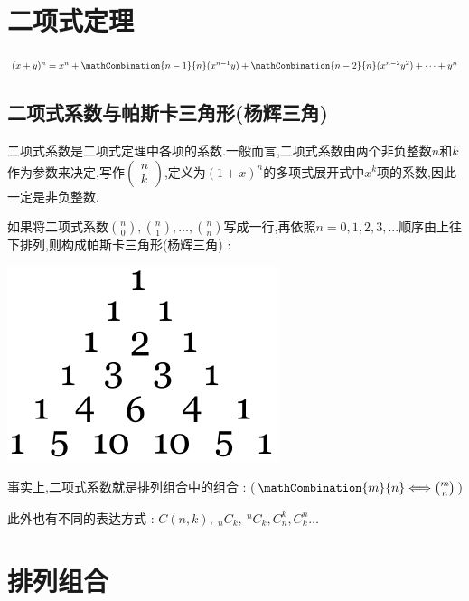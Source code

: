 {\section{二项式定理}{
  $(x + y)^n = x^n + \mathCombination{n - 1}{n}(x^{n-1} y) + \mathCombination{n - 2}{n}(x^{n-2} y^2) + \dots + y^n$

  \subsection{二项式系数与帕斯卡三角形(杨辉三角)}{

      二项式系数是二项式定理中各项的系数.一般而言,二项式系数由两个非负整数$n$和$k$作为参数来决定,写作$\begin{pmatrix}
              n \\
              k
          \end{pmatrix}$,定义为$(1 + x)^n$的多项式展开式中$x^k$项的系数,因此一定是非负整数.

      如果将二项式系数$\binom{n}{0},\binom{n}{1},\dots,\binom{n}{n}$写成一行,再依照$n = 0,1,2,3,...$顺序由上往下排列,则构成帕斯卡三角形(杨辉三角) :
      \begin{center}
          \includegraphics[scale=0.5]{resources/Pascal's_triangle_5.svg.png}
      \end{center}

      事实上,二项式系数就是排列组合中的组合 : ($\mathCombination{m}{n} \Longleftrightarrow \binom{m}{n}$)

      此外也有不同的表达方式 : $C(n,k),~_nC_k,~^nC_k,C^k_n,C^n_k\dots$

  }%

 }%

\section{排列组合}{

}}
